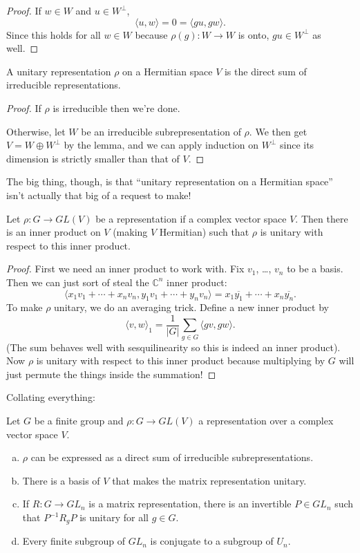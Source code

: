 \documentclass[10pt]{scrartcl}
\providecommand{\ol}{\overline}
\providecommand{\CC}{\mathbb C}
\providecommand{\ii}{\item}
\providecommand{\inv}{^{-1}}
\begin{document}
\begin{proof}
	If $w\in W$ and $u\in W^\perp$,
	\[\langle u,w\rangle = 0 = \langle gu, gw\rangle.\]
	Since this holds for all $w\in W$ because $\rho(g)\colon W\to W$ is onto,
	$gu\in W^\perp$ as well.
\end{proof}

\begin{corollary}
	A unitary representation $\rho$ on a Hermitian space $V$
	is the direct sum of irreducible representations.
\end{corollary}

\begin{proof}
	If $\rho$ is irreducible then we're done.
	
	Otherwise, let $W$ be an irreducible subrepresentation of $\rho$.
	We then get $V = W\oplus W^\perp$ by the lemma,
	and we can apply induction on $W^\perp$ since its dimension
	is strictly smaller than that of $V$.
\end{proof}

The big thing, though, is that ``unitary representation on a Hermitian space''
isn't actually that big of a request to make!
\begin{theorem}
	Let $\rho\colon G\to GL(V)$ be a representation if a complex
	vector space $V$. Then there is an inner product on $V$
	(making $V$ Hermitian) such that $\rho$ is unitary
	with respect to this inner product.
\end{theorem}

\begin{proof}
	First we need an inner product to work with.
	Fix $v_1$, \dots, $v_n$ to be a basis. Then we can just sort of steal
	the $\CC^n$ inner product:
	\[\langle x_1v_1+\cdots+x_nv_n,y_1v_1+\cdots+y_nv_n\rangle
	= x_1\ol{y_1} + \cdots + x_n\ol{y_n}.\]
	To make $\rho$ unitary, we do an averaging trick.
	Define a new inner product by
	\[\langle v,w\rangle_1 = \frac{1}{|G|}\sum_{g\in G}\langle gv,gw\rangle.\]
	(The sum behaves well with sesquilinearity so this is indeed
	an inner product).
	Now $\rho$ is unitary with respect to this inner product
	because multiplying by $G$ will just permute the things
	inside the summation!
\end{proof}

Collating everything:
\begin{corollary}
	Let $G$ be a finite group and $\rho\colon G\to GL(V)$ a representation
	over a complex vector space $V$.
	\begin{enumerate}[(a)]
		\item $\rho$ can be expressed as a direct sum
		of irreducible subrepresentations.
		\ii There is a basis of $V$ that makes the matrix representation
		unitary.
		\ii If $R\colon G\to GL_n$ is a matrix representation,
		there is an invertible $P\in GL_n$ such that $P\inv R_g P$
		is unitary for all $g\in G$.
		\ii Every finite subgroup of $GL_n$ is conjugate to
		a subgroup of $U_n$.
	\end{enumerate}
\end{corollary}
\end{document}
